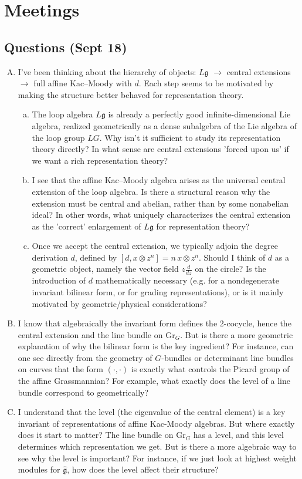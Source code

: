 \documentclass[12pt]{article}
\begin{document}
 \section*{Meetings}
\subsection*{Questions (Sept 18)}
\begin{enumerate}[A.]
    \item I've been thinking about the hierarchy of objects: $L\mathfrak g$ $\to$ central extensions $\to$ full affine Kac–Moody with $d$. Each step seems to be motivated by making the structure better behaved for representation theory.
          \begin{enumerate}[(a)]
              \item The loop algebra $L\mathfrak g$ is already a perfectly good infinite-dimensional Lie algebra, realized geometrically as a dense subalgebra of the Lie algebra of the loop group $LG$. Why isn't it sufficient to study its representation theory directly? In what sense are central extensions 'forced upon us' if we want a rich representation theory?
              \item I see that the affine Kac–Moody algebra arises as the universal central extension of the loop algebra. Is there a structural reason why the extension must be central and abelian, rather than by some nonabelian ideal? In other words, what uniquely characterizes the central extension as the 'correct' enlargement of $L\mathfrak g$ for representation theory?
              \item Once we accept the central extension, we typically adjoin the degree derivation $d$, defined by $[d, x\otimes z^n]=n\,x\otimes z^n$. Should I think of $d$ as a geometric object, namely the vector field $z\frac{d}{dz}$ on the circle? Is the introduction of $d$ mathematically necessary (e.g. for a nondegenerate invariant bilinear form, or for grading representations), or is it mainly motivated by geometric/physical considerations?
          \end{enumerate}
    \item I know that algebraically the invariant form defines the 2-cocycle, hence the central extension and the line bundle on $\mathrm{Gr}_G$. But is there a more geometric explanation of why the bilinear form is the key ingredient? For instance, can one see directly from the geometry of $G$-bundles or determinant line bundles on curves that the form $(\cdot,\cdot)$ is exactly what controls the Picard group of the affine Grassmannian? For example, what exactly does the level of a line bundle correspond to geometrically?
    \item I understand that the level (the eigenvalue of the central element) is a key invariant of representations of affine Kac-Moody algebras. But where exactly does it start to matter? The line bundle on $\mathrm{Gr}_G$ has a level, and this level determines which representation we get. But is there a more algebraic way to see why the level is important? For instance, if we just look at highest weight modules for $\widehat{\mathfrak g}$, how does the level affect their structure?
\end{enumerate}
\end{document}
